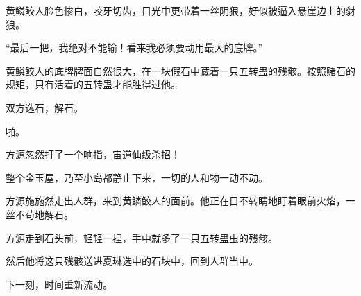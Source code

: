 \begin{this_body}
黄鳞鲛人脸色惨白，咬牙切齿，目光中更带着一丝阴狠，好似被逼入悬崖边上的豺狼。

“最后一把，我绝对不能输！看来我必须要动用最大的底牌。”

黄鳞鲛人的底牌牌面自然很大，在一块假石中藏着一只五转蛊的残骸。按照赌石的规矩，只有活着的五转蛊才能胜得过他。

双方选石，解石。

啪。

方源忽然打了一个响指，宙道仙级杀招！

整个金玉屋，乃至小岛都静止下来，一切的人和物一动不动。

方源施施然走出人群，来到黄鳞鲛人的面前。他正在目不转睛地盯着眼前火焰，一丝不苟地解石。

方源走到石头前，轻轻一捏，手中就多了一只五转蛊虫的残骸。

然后他将这只残骸送进夏琳选中的石块中，回到人群当中。

下一刻，时间重新流动。

\end{this_body}

